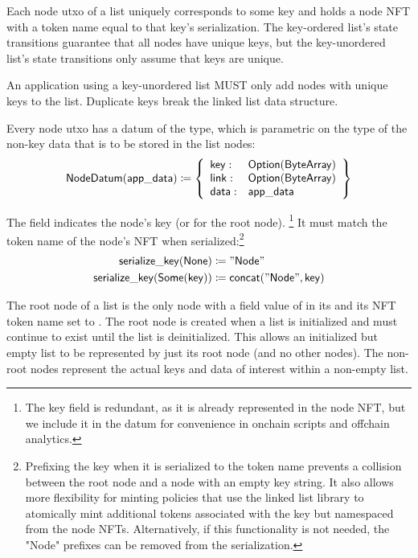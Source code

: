 \documentclass[../midgard.tex]{subfiles}
\begin{document}
Each node utxo of a list uniquely corresponds to some  key and holds a node NFT with a token name equal to that key's serialization.
The key-ordered list's state transitions guarantee that all nodes have unique keys, but the key-unordered list's state transitions only assume that keys are unique.

\newcommand{\unorderedListWarning}[0]{
\begin{warningblock}
An application using a key-unordered list MUST only add nodes with unique keys to the list.
Duplicate keys break the linked list data structure.
\end{warningblock}
}
\unorderedListWarning

Every node utxo has a datum of the  type, which is parametric on the  type of the non-key data that is to be stored in the list nodes:
\begin{equation*}
    \mathsf{NodeDatum} (\mathsf{app\_data}) \coloneq \left\{
    \begin{array}{ll}
        \mathsf{key}  : & \mathsf{Option}(\mathsf{ByteArray}) \\
        \mathsf{link} : & \mathsf{Option}(\mathsf{ByteArray}) \\
        \mathsf{data} : & \mathsf{app\_data}
    \end{array} \right\}
\end{equation*}

The  field indicates the node's key (or  for the root node).
\footnote{The key field is redundant, as it is already represented in the node NFT, but we include it in the datum for convenience in onchain scripts and offchain analytics.} It must match the token name of the node's NFT when serialized:\footnote{Prefixing the key when it is serialized to the token name prevents a collision between the root node and a node with an empty key string.
It also allows more flexibility for minting policies that use the linked list library to atomically mint additional tokens associated with the key but namespaced from the node NFTs.
Alternatively, if this functionality is not needed, the "Node" prefixes can be removed from the serialization.}
\begin{align*}
    \mathsf{serialize\_key} (\mathsf{None}) &\coloneq \mathsf{"Node"} \\
    \mathsf{serialize\_key} (\mathsf{Some} (\mathsf{key})) &\coloneq \mathsf{concat("Node", key)} 
\end{align*}

The root node of a list is the only node with a  field value of  in its  and its NFT token name set to .
The root node is created when a list is initialized and must continue to exist until the list is deinitialized.
This allows an initialized but empty list to be represented by just its root node (and no other nodes).
The non-root nodes represent the actual keys and data of interest within a non-empty list.
\end{document}
